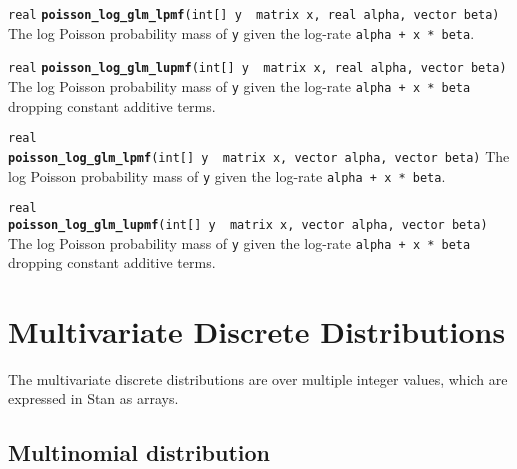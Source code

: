 \documentclass[
  10pt,
]{book}
\begin{document}
\texttt{real} \textbf{\texttt{poisson\_log\_glm\_lpmf}}\texttt{(int{[}{]}\ y\ \textbar{}\ matrix\ x,\ real\ alpha,\ vector\ beta)}\newline
The log Poisson probability mass of \texttt{y} given the log-rate \texttt{alpha\ +\ x\ *\ beta}.


\texttt{real} \textbf{\texttt{poisson\_log\_glm\_lupmf}}\texttt{(int{[}{]}\ y\ \textbar{}\ matrix\ x,\ real\ alpha,\ vector\ beta)}\newline
The log Poisson probability mass of \texttt{y} given the log-rate \texttt{alpha\ +\ x\ *\ beta}
dropping constant additive terms.


\texttt{real} \textbf{\texttt{poisson\_log\_glm\_lpmf}}\texttt{(int{[}{]}\ y\ \textbar{}\ matrix\ x,\ vector\ alpha,\ vector\ beta)}\newline
The log Poisson probability mass of \texttt{y} given the log-rate \texttt{alpha\ +\ x\ *\ beta}.


\texttt{real} \textbf{\texttt{poisson\_log\_glm\_lupmf}}\texttt{(int{[}{]}\ y\ \textbar{}\ matrix\ x,\ vector\ alpha,\ vector\ beta)}\newline
The log Poisson probability mass of \texttt{y} given the log-rate \texttt{alpha\ +\ x\ *\ beta}
dropping constant additive terms.

\hypertarget{multivariate-discrete-distributions}{%
\chapter{Multivariate Discrete Distributions}\label{multivariate-discrete-distributions}}

The multivariate discrete distributions are over multiple integer
values, which are expressed in Stan as arrays.

\hypertarget{multinomial-distribution}{%
\section{Multinomial distribution}\label{multinomial-distribution}}
\end{document}
